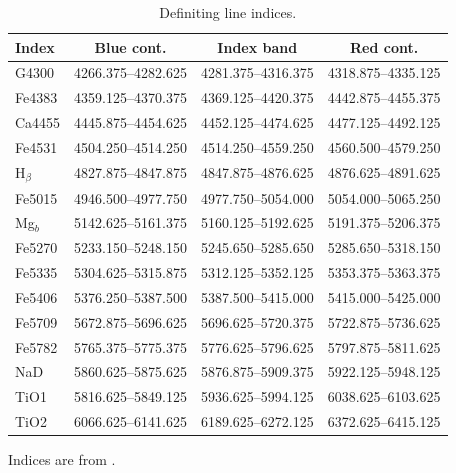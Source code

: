 		\begin{table}
		\begin{threeparttable}
			\centering
			\caption{Definiting line indices.}
			\label{tab:abIndex}
			\begin{tabular}{l c c c}
				\hline
				\hline
				Index 	& Blue cont. 		& Index band 		& Red cont. \\
				\hline 
				G4300 	& 4266.375--4282.625 & 4281.375--4316.375 & 4318.875--4335.125 \\
				Fe4383 	& 4359.125--4370.375 & 4369.125--4420.375 & 4442.875--4455.375 \\
				Ca4455 	& 4445.875--4454.625 & 4452.125--4474.625 & 4477.125--4492.125 \\
				Fe4531 	& 4504.250--4514.250 & 4514.250--4559.250 & 4560.500--4579.250 \\
				H$_\beta$ & 4827.875--4847.875 & 4847.875--4876.625 & 4876.625--4891.625 \\
				Fe5015 	& 4946.500--4977.750 & 4977.750--5054.000 & 5054.000--5065.250 \\
				Mg$_b$ 	& 5142.625--5161.375 & 5160.125--5192.625 & 5191.375--5206.375 \\
				Fe5270 	& 5233.150--5248.150 & 5245.650--5285.650 & 5285.650--5318.150 \\
				Fe5335 	& 5304.625--5315.875 & 5312.125--5352.125 & 5353.375--5363.375 \\
				Fe5406 	& 5376.250--5387.500 & 5387.500--5415.000 & 5415.000--5425.000 \\
				Fe5709 	& 5672.875--5696.625 & 5696.625--5720.375 & 5722.875--5736.625 \\
				Fe5782 	& 5765.375--5775.375 & 5776.625--5796.625 & 5797.875--5811.625 \\
				NaD 	& 5860.625--5875.625 & 5876.875--5909.375 & 5922.125--5948.125 \\
				TiO1 	& 5816.625--5849.125 & 5936.625--5994.125 & 6038.625--6103.625 \\
				TiO2 	& 6066.625--6141.625 & 6189.625--6272.125 & 6372.625--6415.125 \\
				\hline
				\hline
			\end{tabular}
			\begin{tablenotes}
			\footnotesize
			\item Indices are from \citet{Trager1998}.
			\end{tablenotes}
		\end{threeparttable}
		\end{table}


